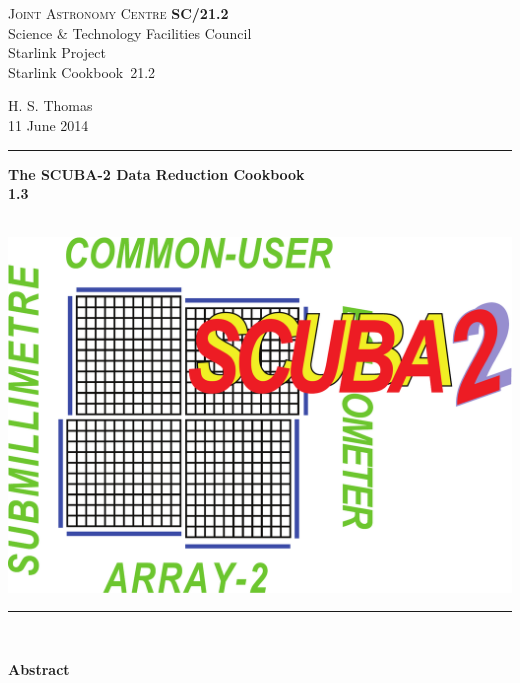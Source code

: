 \documentclass[twoside,11pt]{article}
\newcommand{\stardoccategory}  {Starlink Cookbook}
\newcommand{\stardocinitials}  {SC}
\newcommand{\stardocnumber}    {21.2}
\newcommand{\stardocauthors}   {H. S. Thomas}
\newcommand{\stardocdate}      {11 June 2014}
\newcommand{\stardoctitle}     {The SCUBA-2 Data Reduction Cookbook}
\newcommand{\stardocversion}   {1.3}
\newcommand{\stardocmanual}    {\ }
\newcommand{\stardocname}{\stardocinitials /\stardocnumber}
\newenvironment{latexonly}{}{}
\renewcommand{\_}{\texttt{\symbol{95}}}
\begin{document}
\thispagestyle{empty}

\begin{latexonly}
   \textsc{Joint Astronomy Centre} \hfill \textbf{\stardocname}\\
   {\large Science \& Technology Facilities Council}\\
   {\large Starlink Project\\}
   {\large \stardoccategory\ \stardocnumber}
   \begin{flushright}
   \stardocauthors\\
   \stardocdate
   \end{flushright}
   \vspace{-4mm}
   \rule{\textwidth}{0.5mm}
   \vspace{5mm}
   \begin{center}
   {\Huge\textbf{\stardoctitle \\ [2.5ex]}}
   {\LARGE\textbf{\stardocversion \\ [4ex]}}
   {\Huge\textbf{\stardocmanual}}
   \end{center}
   \vspace{5mm}

   \begin{center}
   \includegraphics[scale=0.4]{sc21_s2logo}
   \end{center}
   \vspace{5mm}
   \rule{\textwidth}{0.5mm}\\
   \vspace{15mm}

   \vspace{10mm}
   \begin{center}
      {\Large\textbf{Abstract}}
   \end{center}
\end{latexonly}
\end{document}
